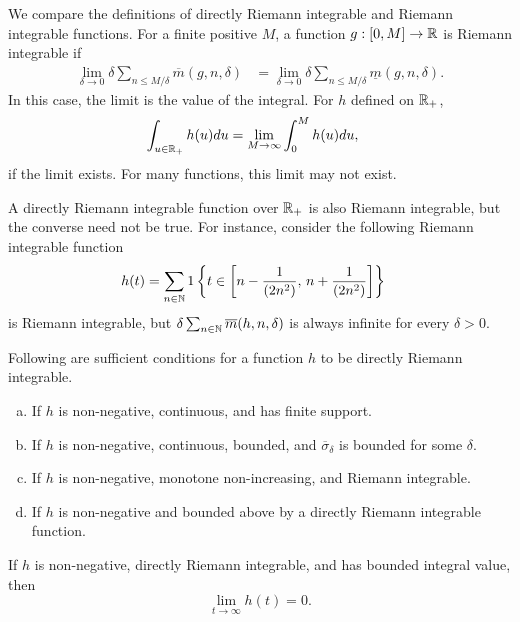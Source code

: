 \documentclass[a4paper,10pt,english]{article}
\begin{document}
\begin{shaded*}
We compare the definitions of directly Riemann integrable and Riemann integrable functions. 
For a finite positive $M$, a function $g: [0, M] \to \mathbb{R} $ is Riemann integrable if 
\begin{align*}
\lim_{\delta \to 0} \delta \sum_{n \leq M/\delta}\overline{m}(g,n,\delta) &=\lim_{\delta \to 0} \delta \sum_{n \leq M/\delta}\underline{m}(g,n,\delta). 
\end{align*} 
In this case, the limit is the value of the integral. 
For $h$ defined on $\mathbb{R}_+$, 
\begin{align*}
\int_{u \in \mathbb{R}_+}h(u)du &= \lim_{M \to \infty}\int_{0}^{M}h(u)du, 
\end{align*}
if the limit exists. For many functions, this limit may not exist.

A directly Riemann integrable function over $\mathbb{R}_+$ is also Riemann integrable, but the converse need not be true. 
For instance, consider the following Riemann integrable function
\begin{align*}
h(t) &= \sum_{n\in\mathbb{N}}1\left\{t \in \left[n-\frac{1}{(2n^2)},\,n+\frac{1}{(2n^2)}\right]\right\}
\end{align*} is Riemann integrable, but $\delta \sum_{n \in \mathbb{N}}\overline{m}(h,n,\delta)$ is always infinite for every $\delta>0.$
\end{shaded*}
\begin{prop}%
Following are sufficient conditions for a function $h$ to be directly Riemann integrable.
  \begin{enumerate}[(a)]
  \item If $h$ is non-negative, continuous, and has finite support. 
  \item If $h$ is non-negative, continuous, bounded, and $\overline{\sigma}_{\delta}$ is bounded for some $\delta$.  
  \item If $h$ is non-negative, monotone non-increasing, and Riemann integrable. 
  \item If $h$ is non-negative and bounded above by a directly Riemann integrable function.
  \end{enumerate}
\end{prop}
\begin{prop} If $h$ is non-negative, directly Riemann integrable, and has bounded integral value, then 
\begin{equation*}
\lim_{t \to \infty} h(t)=0.
\end{equation*}
\end{prop}
\end{document}
